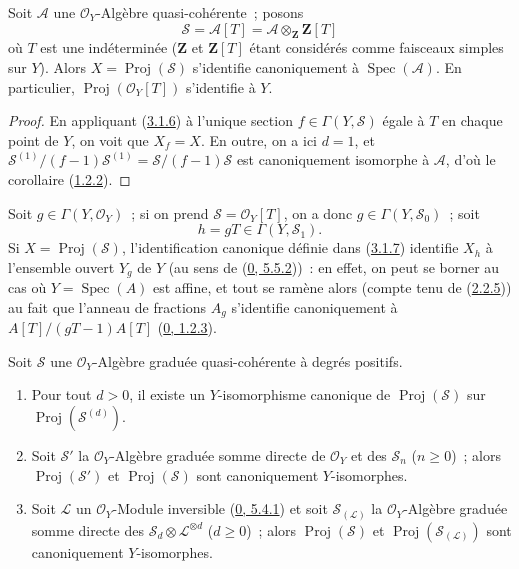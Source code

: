 \begin{corollary}[3.1.7]
\label{II.3.1.7-fr}
Soit $\mathcal{A}$ une $\mathcal{O}_Y$-Algèbre quasi-cohérente~; posons
\[
  \mathcal{S}=\mathcal{A}[T]
  =\mathcal{A}\otimes_{\mathbf{Z}}\mathbf{Z}[T]
\]
où $T$ est une indéterminée ($\mathbf{Z}$ et $\mathbf{Z}[T]$ étant
considérés comme faisceaux simples sur $Y$). Alors
$X=\operatorname{Proj}(\mathcal{S})$ s'identifie canoniquement à
$\operatorname{Spec}(\mathcal{A})$. En particulier,
$\operatorname{Proj}(\mathcal{O}_Y[T])$ s'identifie à $Y$.
\end{corollary}

\begin{proof}
En appliquant (\hyperref[II.3.1.6-fr]{3.1.6}) à l'unique section
$f\in\Gamma(Y,\mathcal{S})$ égale à $T$ en chaque point de $Y$, on voit que
$X_f=X$. En outre, on a ici $d=1$, et
$\mathcal{S}^{(1)}/(f-1)\mathcal{S}^{(1)}
=\mathcal{S}/(f-1)\mathcal{S}$ est canoniquement isomorphe à $\mathcal{A}$,
d'où le corollaire (\hyperref[II.1.2.2-fr]{1.2.2}).
\end{proof}

Soit $g\in\Gamma(Y,\mathcal{O}_Y)$~; si on prend
$\mathcal{S}=\mathcal{O}_Y[T]$, on a donc $g\in\Gamma(Y,\mathcal{S}_0)$~; soit
\[
  h=gT\in\Gamma(Y,\mathcal{S}_1).
\]
Si $X=\operatorname{Proj}(\mathcal{S})$, l'identification canonique définie
dans (\hyperref[II.3.1.7-fr]{3.1.7}) identifie $X_h$ à l'ensemble ouvert
$Y_g$ de $Y$ (au sens de (\hyperref[0.5.5.2-fr]{0, 5.5.2}))~: en effet, on
peut se borner au cas où $Y=\operatorname{Spec}(A)$ est affine, et tout se
ramène alors (compte tenu de (\hyperref[II.2.2.5-fr]{2.2.5})) au fait que
l'anneau de fractions $A_g$ s'identifie canoniquement à
$A[T]/(gT-1)A[T]$ (\hyperref[0.1.2.3-fr]{0, 1.2.3}).

\begin{proposition}[3.1.8]
\label{II.3.1.8-fr}
Soit $\mathcal{S}$ une $\mathcal{O}_Y$-Algèbre graduée quasi-cohérente à
degrés positifs.
\begin{enumerate}
  \item[\rm(i)] Pour tout $d>0$, il existe un $Y$-isomorphisme canonique de
    $\operatorname{Proj}(\mathcal{S})$ sur
    $\operatorname{Proj}(\mathcal{S}^{(d)})$.


  \item[\rm(ii)] Soit $\mathcal{S}'$ la $\mathcal{O}_Y$-Algèbre graduée
    somme directe de $\mathcal{O}_Y$ et des $\mathcal{S}_n$ ($n\geq0$)~;
    alors $\operatorname{Proj}(\mathcal{S}')$ et
    $\operatorname{Proj}(\mathcal{S})$ sont canoniquement $Y$-isomorphes.
  \item[\rm(iii)] Soit $\mathcal{L}$ un $\mathcal{O}_Y$-Module inversible
    (\hyperref[0.5.4.1-fr]{0, 5.4.1}) et soit $\mathcal{S}_{(\mathcal{L})}$ la
    $\mathcal{O}_Y$-Algèbre graduée somme directe des
    $\mathcal{S}_d\otimes\mathcal{L}^{\otimes d}$ ($d\geq0$)~; alors
    $\operatorname{Proj}(\mathcal{S})$ et
    $\operatorname{Proj}(\mathcal{S}_{(\mathcal{L})})$ sont canoniquement
    $Y$-isomorphes.
\end{enumerate}
\end{proposition}

